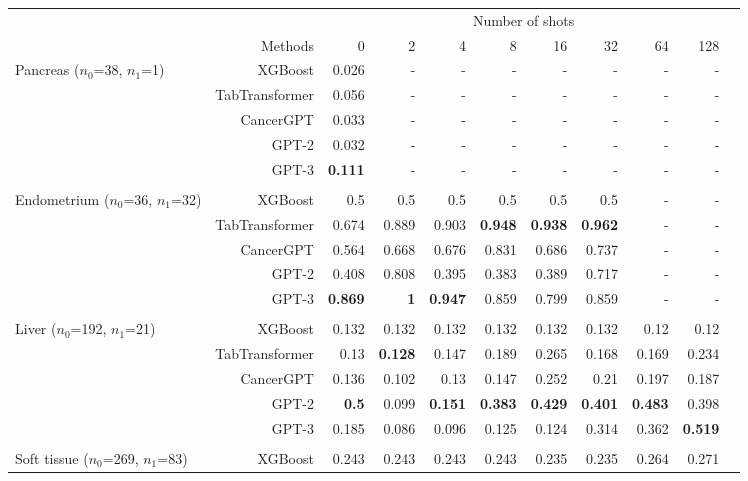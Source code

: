 {\begin{adjustwidth}{-2.5cm}{-2.5cm}\centering\begin{threeparttable}[!htb]
\scriptsize
\begin{tabular}{lrrrrrrrrrr}\toprule
& &\multicolumn{8}{c}{Number of shots} \\\cmidrule{3-10}
&Methods &0 &2 &4 &8 &16 &32 &64 &128 \\\midrule
\multirowcell{5}{Pancreas \\ ($n_0$=38, $n_1$=1)} &XGBoost &0.026 &- &- &- &- &- &- &- \\
&TabTransformer &0.056 &- &- &- &- &- &- &- \\
&CancerGPT &0.033 &- &- &- &- &- &- &- \\
&GPT-2 &0.032 &- &- &- &- &- &- &- \\
&GPT-3 &\textbf{0.111} &- &- &- &- &- &- &- \\
& & & & & & & & & \\
\multirowcell{5}{Endometrium \\ ($n_0$=36, $n_1$=32)} &XGBoost &0.5 &0.5 &0.5 &0.5 &0.5 &0.5 &- &- \\
&TabTransformer &0.674 &0.889 &0.903 &\textbf{0.948} &\textbf{0.938} &\textbf{0.962} &- &- \\
&CancerGPT &0.564 &0.668 &0.676 &0.831 &0.686 &0.737 &- &- \\
&GPT-2 &0.408 &0.808 &0.395 &0.383 &0.389 &0.717 &- &- \\
&GPT-3 &\textbf{0.869} &\textbf{1} &\textbf{0.947} &0.859 &0.799 &0.859 &- &- \\ \\
\multirowcell{5}{Liver \\ ($n_0$=192, $n_1$=21)} &XGBoost &0.132 &0.132 &0.132 &0.132 &0.132 &0.132 &0.12 &0.12 \\
&TabTransformer &0.13 &\textbf{0.128} &0.147 &0.189 &0.265 &0.168 &0.169 &0.234 \\
&CancerGPT &0.136 &0.102 &0.13 &0.147 &0.252 &0.21 &0.197 &0.187 \\
&GPT-2 &\textbf{0.5} &0.099 &\textbf{0.151} &\textbf{0.383} &\textbf{0.429} &\textbf{0.401} &\textbf{0.483} &0.398 \\
&GPT-3 &0.185 &0.086 &0.096 &0.125 &0.124 &0.314 &0.362 &\textbf{0.519} \\ \\
\multirowcell{5}{Soft tissue \\ ($n_0$=269, $n_1$=83)} &XGBoost &0.243 &0.243 &0.243 &0.243 &0.235 &0.235 &0.264 &0.271 \\

\end{tabular}
\end{threeparttable}
\end{adjustwidth}}
